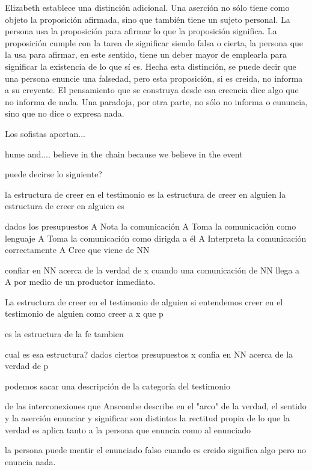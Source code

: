    Elizabeth establece una distinción adicional. Una aserción no sólo tiene como objeto la proposición afirmada, sino que también tiene un sujeto personal. La persona usa la proposición para afirmar lo que la proposición significa. La proposición cumple con la tarea de significar siendo falsa o cierta, la persona que la usa para afirmar, en este sentido, tiene un deber mayor de emplearla para significar la existencia de lo que sí es\autocite[Cf.~][267]{anscombe2015logic:tsa}. Hecha esta distinción, se puede decir que una persona enuncie una falsedad, pero esta proposición, si es creida, no informa a su creyente. El pensamiento que se construya desde esa creencia dice algo que no informa de nada\autocite[Cf.~][271]{anscombe2015logic:tsa}. Una paradoja, por otra parte, no sólo no informa o eununcia, sino que no dice o expresa nada\autocite[Cf.~][271]{anscombe2015logic:tsa}.







Los sofistas aportan...

hume and.... believe in the chain because we believe in the event

puede decirse lo siguiente?

la estructura de creer en el testimonio es la estructura de creer en alguien
la estructura de creer en alguien es

dados los presupuestos
A Nota la comunicación
A Toma la comunicación como lenguaje
A Toma la comunicación como dirigda a él
A Interpreta la comunicación correctamente
A Cree que viene de NN

confiar en NN acerca de la verdad de x cuando una comunicación de NN llega a A por medio de un productor inmediato.

La estructura de creer en el testimonio de alguien
si entendemos creer en el testimonio de alguien como
creer a x que p

es la estructura de la fe tambien

cual es esa estructura?
dados ciertos presupuestos
x confia en NN acerca de la verdad de p

podemos sacar una descripción de
la categoría del testimonio

de las interconexiones que Anscombe describe
en el "arco" de la verdad, el sentido y la aserción
enunciar y significar son distintos
la rectitud propia de lo que la verdad es aplica tanto a la persona que enuncia como al enunciado

la persona puede mentir
el enunciado falso cuando es creido significa algo pero no enuncia nada.

